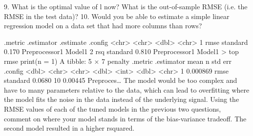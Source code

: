 \documentclass{article}
\begin{document}
9. What is the optimal value of l now?
What is the out-of-sample RMSE (i.e. the RMSE in the test data)?
10. Would you be able to estimate a simple linear regression model on a data set that had more columns than rows? 

  .metric .estimator .estimate .config             
  <chr>   <chr>          <dbl> <chr>               
1 rmse    standard       0.170 Preprocessor1 Model1
2 rsq     standard       0.810 Preprocessor1 Model1
> top rmse  print(n = 1)
 A tibble: 5 × 7
   penalty .metric .estimator   mean     n std err .config   
     <dbl> <chr>   <chr>       <dbl> <int>   <dbl> <chr>     
1 0.000869 rmse    standard   0.0680    10 0.00445 Preproces…
The model would be too complex and have to many parameters relative to the data, which can lead to overfitting where the model fits the noise in the data instead of the underlying signal.  
Using the RMSE values of each of the tuned models in the previous two
questions, comment on where your model stands in terms of the bias-variance tradeoff. 
The second model resulted in a  higher rsquared. 
\end{document}
